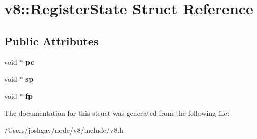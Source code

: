 \hypertarget{structv8_1_1_register_state}{}\section{v8\+:\+:Register\+State Struct Reference}
\label{structv8_1_1_register_state}
\subsection*{Public Attributes}
\begin{DoxyCompactItemize}
\item 
void $\ast$ {\bfseries pc}\hypertarget{structv8_1_1_register_state_aa0d0327871d9f95d5e64f47b7f183907}{}\label{structv8_1_1_register_state_aa0d0327871d9f95d5e64f47b7f183907}

\item 
void $\ast$ {\bfseries sp}\hypertarget{structv8_1_1_register_state_a867bb9d0b9e81c3f7256aa81dc0daee4}{}\label{structv8_1_1_register_state_a867bb9d0b9e81c3f7256aa81dc0daee4}

\item 
void $\ast$ {\bfseries fp}\hypertarget{structv8_1_1_register_state_aaeb80a1d7f6df3ae418f3e9b1295d156}{}\label{structv8_1_1_register_state_aaeb80a1d7f6df3ae418f3e9b1295d156}

\end{DoxyCompactItemize}


The documentation for this struct was generated from the following file\+:\begin{DoxyCompactItemize}
\item 
/\+Users/joshgav/node/v8/include/v8.\+h\end{DoxyCompactItemize}
